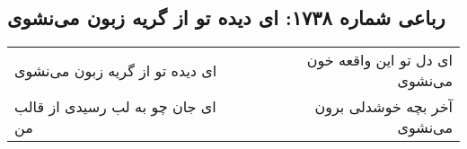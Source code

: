 \begin{center}
\section*{رباعی شماره ۱۷۳۸: ای دیده تو از گریه زبون می‌نشوی}
\label{sec:1738}
\begin{longtable}{l p{0.5cm} r}
ای دیده تو از گریه زبون می‌نشوی
&&
ای دل تو این واقعه خون می‌نشوی
\\
ای جان چو به لب رسیدی از قالب من
&&
آخر بچه خوشدلی برون می‌نشوی
\\
\end{longtable}
\end{center}
